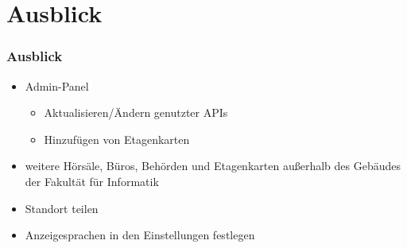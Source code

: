 \section{Ausblick}

\begin{frame}\frametitle{Ausblick}
    \begin{itemize}
        \item Admin-Panel
            \begin{itemize}
                \item Aktualisieren/Ändern genutzter APIs
                \item Hinzufügen von Etagenkarten
            \end{itemize}
        \item weitere Hörsäle, Büros, Behörden und Etagenkarten außerhalb des Gebäudes der Fakultät für Informatik
        \item Standort teilen
        \item Anzeigesprachen in den Einstellungen festlegen
    \end{itemize}    
\end{frame}